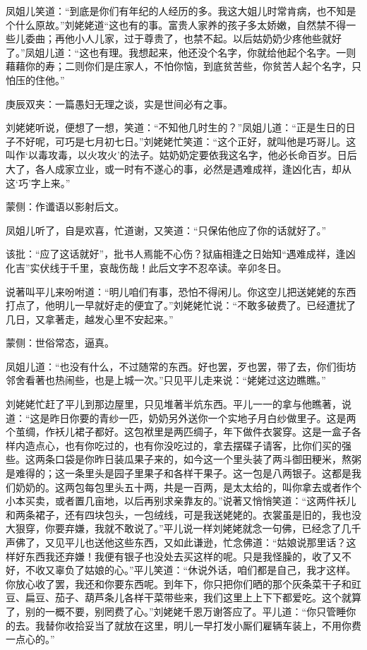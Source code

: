 \begin{parag}
    凤姐儿笑道：“到底是你们有年纪的人经历的多。我这大姐儿时常肯病，也不知是个什么原故。”刘姥姥道“这也有的事。富贵人家养的孩子多太娇嫩，自然禁不得一些儿委曲；再他小人儿家，过于尊贵了，也禁不起。以后姑奶奶少疼他些就好了。”凤姐儿道：“这也有理。我想起来，他还没个名字，你就给他起个名字。一则藉藉你的寿；二则你们是庄家人，不怕你恼，到底贫苦些，你贫苦人起个名字，只怕压的住他。”\begin{note}庚辰双夹：一篇愚妇无理之谈，实是世间必有之事。\end{note}刘姥姥听说，便想了一想，笑道：“不知他几时生的？”凤姐儿道：“正是生日的日子不好呢，可巧是七月初七日。”刘姥姥忙笑道：“这个正好，就叫他是巧哥儿。这叫作‘以毒攻毒，以火攻火’的法子。姑奶奶定要依我这名字，他必长命百岁。日后大了，各人成家立业，或一时有不遂心的事，必然是遇难成祥，逢凶化吉，却从这‘巧’字上来。”\begin{note}蒙侧：作谶语以影射后文。\end{note}
\end{parag}


\begin{parag}
    凤姐儿听了，自是欢喜，忙道谢，又笑道：“只保佑他应了你的话就好了。”\begin{note} 该批：“应了这话就好”，批书人焉能不心伤？狱庙相逢之日始知“遇难成祥，逢凶化吉”实伏线于千里，哀哉伤哉！此后文字不忍卒读。辛卯冬日。\end{note}说著叫平儿来吩咐道：“明儿咱们有事，恐怕不得闲儿。你这空儿把送姥姥的东西打点了，他明儿一早就好走的便宜了。”刘姥姥忙说：“不敢多破费了。已经遭扰了几日，又拿著走，越发心里不安起来。”\begin{note}蒙侧：世俗常态，逼真。\end{note}凤姐儿道：“也没有什么，不过随常的东西。好也罢，歹也罢，带了去，你们街坊邻舍看著也热闹些，也是上城一次。”只见平儿走来说：“姥姥过这边瞧瞧。”
\end{parag}


\begin{parag}
    刘姥姥忙赶了平儿到那边屋里，只见堆著半炕东西。平儿一一的拿与他瞧著，说道：“这是昨日你要的青纱一匹，奶奶另外送你一个实地子月白纱做里子。这是两个茧绸，作袄儿裙子都好。这包袱里是两匹绸子，年下做件衣裳穿。这是一盒子各样内造点心，也有你吃过的，也有你没吃过的，拿去摆碟子请客，比你们买的强些。这两条口袋是你昨日装瓜果子来的，如今这一个里头装了两斗御田粳米，熬粥是难得的；这一条里头是园子里果子和各样干果子。这一包是八两银子。这都是我们奶奶的。这两包每包里头五十两，共是一百两，是太太给的，叫你拿去或者作个小本买卖，或者置几亩地，以后再别求亲靠友的。”说著又悄悄笑道：“这两件袄儿和两条裙子，还有四块包头，一包绒线，可是我送姥姥的。衣裳虽是旧的，我也没大狠穿，你要弃嫌，我就不敢说了。”平儿说一样刘姥姥就念一句佛，已经念了几千声佛了，又见平儿也送他这些东西，又如此谦逊，忙念佛道：“姑娘说那里话？这样好东西我还弃嫌！我便有银子也没处去买这样的呢。只是我怪臊的，收了又不好，不收又辜负了姑娘的心。”平儿笑道：“休说外话，咱们都是自己，我才这样。你放心收了罢，我还和你要东西呢。到年下，你只把你们晒的那个灰条菜干子和豇豆、扁豆、茄子、葫芦条儿各样干菜带些来，我们这里上上下下都爱吃。这个就算了，别的一概不要，别罔费了心。”刘姥姥千恩万谢答应了。平儿道：“你只管睡你的去。我替你收拾妥当了就放在这里，明儿一早打发小厮们雇辆车装上，不用你费一点心的。”
\end{parag}


